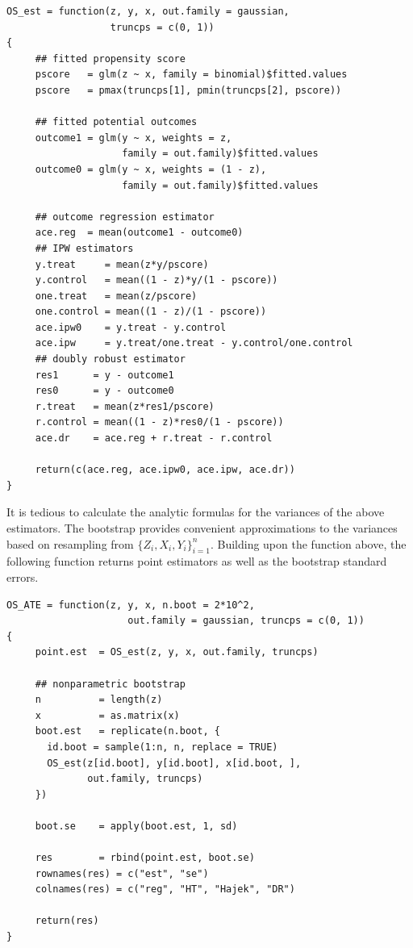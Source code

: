 \begin{lstlisting}
OS_est = function(z, y, x, out.family = gaussian, 
                  truncps = c(0, 1))
{
     ## fitted propensity score
     pscore   = glm(z ~ x, family = binomial)$fitted.values
     pscore   = pmax(truncps[1], pmin(truncps[2], pscore))
     
     ## fitted potential outcomes
     outcome1 = glm(y ~ x, weights = z, 
                    family = out.family)$fitted.values
     outcome0 = glm(y ~ x, weights = (1 - z), 
                    family = out.family)$fitted.values
     
     ## outcome regression estimator
     ace.reg  = mean(outcome1 - outcome0) 
     ## IPW estimators
     y.treat     = mean(z*y/pscore)
     y.control   = mean((1 - z)*y/(1 - pscore))
     one.treat   = mean(z/pscore)
     one.control = mean((1 - z)/(1 - pscore))
     ace.ipw0    = y.treat - y.control
     ace.ipw     = y.treat/one.treat - y.control/one.control
     ## doubly robust estimator
     res1      = y - outcome1
     res0      = y - outcome0
     r.treat   = mean(z*res1/pscore)
     r.control = mean((1 - z)*res0/(1 - pscore))
     ace.dr    = ace.reg + r.treat - r.control

     return(c(ace.reg, ace.ipw0, ace.ipw, ace.dr))     
}
\end{lstlisting}


It is tedious to calculate the analytic formulas for the variances of the above estimators. The bootstrap provides convenient approximations to the variances based on resampling from $\{ Z_i, X_i, Y_i \}_{i=1}^n$. Building upon the function  above, the following function returns point estimators as well as the bootstrap standard errors. 


\begin{lstlisting}
OS_ATE = function(z, y, x, n.boot = 2*10^2,
                     out.family = gaussian, truncps = c(0, 1))
{
     point.est  = OS_est(z, y, x, out.family, truncps)
     
     ## nonparametric bootstrap
     n          = length(z)
     x          = as.matrix(x)
     boot.est   = replicate(n.boot, {
       id.boot = sample(1:n, n, replace = TRUE)
       OS_est(z[id.boot], y[id.boot], x[id.boot, ], 
              out.family, truncps)
     })

     boot.se    = apply(boot.est, 1, sd)
     
     res        = rbind(point.est, boot.se)
     rownames(res) = c("est", "se")
     colnames(res) = c("reg", "HT", "Hajek", "DR")
     
     return(res)
}
\end{lstlisting}




